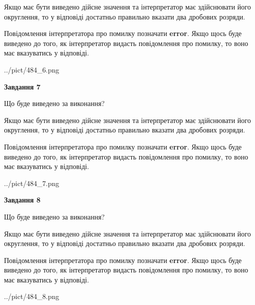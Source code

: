 \documentclass[12pt, ukrainian]{article}
\begin{document}
{\begin {Large}
Якщо має бути виведено дійсне значення та інтерпретатор має здійснювати його округлення, 
то у відповіді достатньо правильно вказати два дробових розряди.

Повідомлення інтерпретатора про помилку позначати \textbf{error}.
Якщо щось буде виведено до того, як інтерпретатор видасть повідомлення про помилку, 
то воно має вказуватись у відповіді. \par

\begin{center}
	{../pict/484_6.png}
\end{center}
\newpage

{\begin {center}\textbf{Завдання 7}\end {center}}\par
Що буде виведено за виконання? \par

Якщо має бути виведено дійсне значення та інтерпретатор має здійснювати його округлення, 
то у відповіді достатньо правильно вказати два дробових розряди.

Повідомлення інтерпретатора про помилку позначати \textbf{error}.
Якщо щось буде виведено до того, як інтерпретатор видасть повідомлення про помилку, 
то воно має вказуватись у відповіді. \par

\begin{center}
	{../pict/484_7.png}
\end{center}
\newpage

{\begin {center}\textbf{Завдання 8}\end {center}}\par
Що буде виведено за виконання? \par

Якщо має бути виведено дійсне значення та інтерпретатор має здійснювати його округлення, 
то у відповіді достатньо правильно вказати два дробових розряди.

Повідомлення інтерпретатора про помилку позначати \textbf{error}.
Якщо щось буде виведено до того, як інтерпретатор видасть повідомлення про помилку, 
то воно має вказуватись у відповіді. \par

\begin{center}
	{../pict/484_8.png}
\end{center}
\newpage


\end{Large}}
\end{document}
